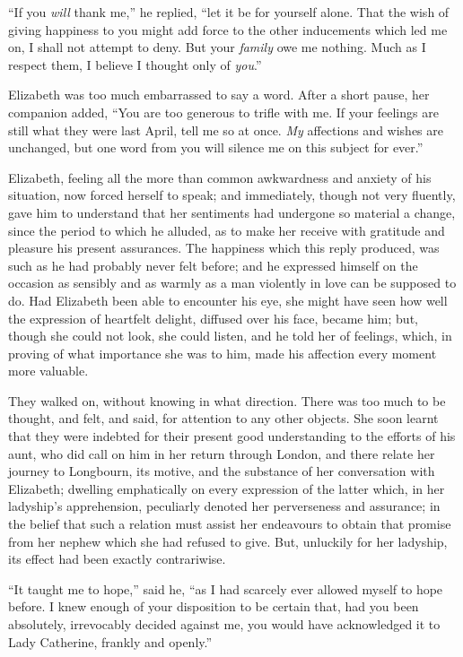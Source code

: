 ``If you \emph{will} thank me,'' he replied, ``let it be for yourself
alone.  That the wish of giving happiness to you might add
force to the other inducements which led me on, I shall not
attempt to deny.  But your \emph{family} owe me nothing.  Much as
I respect them, I believe I thought only of \emph{you}.''

Elizabeth was too much embarrassed to say a word.  After a
short pause, her companion added, ``You are too generous to
trifle with me.  If your feelings are still what they were
last April, tell me so at once.  \emph{My} affections and wishes
are unchanged, but one word from you will silence me on this
subject for ever.''

Elizabeth, feeling all the more than common awkwardness and
anxiety of his situation, now forced herself to speak; and
immediately, though not very fluently, gave him to understand
that her sentiments had undergone so material a change, since
the period to which he alluded, as to make her receive with
gratitude and pleasure his present assurances.  The happiness
which this reply produced, was such as he had probably never
felt before; and he expressed himself on the occasion as
sensibly and as warmly as a man violently in love can be
supposed to do.  Had Elizabeth been able to encounter his
eye, she might have seen how well the expression of heartfelt
delight, diffused over his face, became him; but, though she
could not look, she could listen, and he told her of feelings,
which, in proving of what importance she was to him, made his
affection every moment more valuable.

They walked on, without knowing in what direction.  There was
too much to be thought, and felt, and said, for attention to
any other objects.  She soon learnt that they were indebted
for their present good understanding to the efforts of his
aunt, who did call on him in her return through London,
and there relate her journey to Longbourn, its motive, and
the substance of her conversation with Elizabeth; dwelling
emphatically on every expression of the latter which, in her
ladyship's apprehension, peculiarly denoted her perverseness
and assurance; in the belief that such a relation must assist
her endeavours to obtain that promise from her nephew which
she had refused to give.  But, unluckily for her ladyship,
its effect had been exactly contrariwise.

``It taught me to hope,'' said he, ``as I had scarcely ever allowed
myself to hope before.  I knew enough of your disposition to
be certain that, had you been absolutely, irrevocably decided
against me, you would have acknowledged it to Lady Catherine,
frankly and openly.''

